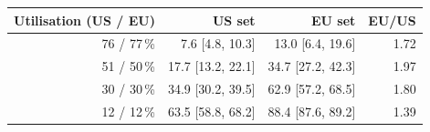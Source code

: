 \begin{tabular}{rrrr}
\toprule
Utilisation (US / EU) & US set & EU set & EU/US \\
\midrule
76 / 77\,\% & 7.6 [4.8, 10.3] & 13.0 [6.4, 19.6] & 1.72 \\
51 / 50\,\% & 17.7 [13.2, 22.1] & 34.7 [27.2, 42.3] & 1.97 \\
30 / 30\,\% & 34.9 [30.2, 39.5] & 62.9 [57.2, 68.5] & 1.80 \\
12 / 12\,\% & 63.5 [58.8, 68.2] & 88.4 [87.6, 89.2] & 1.39 \\
\bottomrule
\end{tabular}
